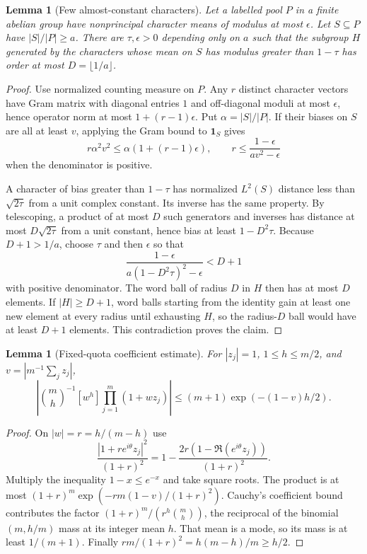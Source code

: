 \documentclass[11pt]{article}
\newtheorem{lemma}[theorem]{Lemma}
\theoremstyle{remark}\newtheorem{remark}[theorem]{Remark}
\newcommand{\abs}[1]{\left|#1\right|}
\newcommand{\one}{\mathbf 1}
\begin{document}
\begin{lemma}[Few almost-constant characters]\label{lem:gram}
Let a labelled pool $P$ in a finite abelian group have nonprincipal character means of modulus at most $\epsilon$. Let $S\subseteq P$ have $|S|/|P|\ge a$. There are $\tau,\epsilon>0$ depending only on $a$ such that the subgroup $H$ generated by the characters whose mean on $S$ has modulus greater than $1-\tau$ has order at most $D=\lfloor1/a\rfloor$.
\end{lemma}
\begin{proof}
Use normalized counting measure on $P$. Any $r$ distinct character vectors have Gram matrix with diagonal entries $1$ and off-diagonal moduli at most $\epsilon$, hence operator norm at most $1+(r-1)\epsilon$. Put $\alpha=|S|/|P|$. If their biases on $S$ are all at least $v$, applying the Gram bound to $\one_S$ gives
\[
 r\alpha^2v^2\le\alpha(1+(r-1)\epsilon),\qquad
 r\le\frac{1-\epsilon}{a v^2-\epsilon}
\]
when the denominator is positive.

A character of bias greater than $1-\tau$ has normalized $L^2(S)$ distance less than $\sqrt{2\tau}$ from a unit complex constant. Its inverse has the same property. By telescoping, a product of at most $D$ such generators and inverses has distance at most $D\sqrt{2\tau}$ from a unit constant, hence bias at least $1-D^2\tau$. Because $D+1>1/a$, choose $\tau$ and then $\epsilon$ so that
\[
 \frac{1-\epsilon}{a(1-D^2\tau)^2-\epsilon}<D+1
\]
with positive denominator. The word ball of radius $D$ in $H$ then has at most $D$ elements. If $|H|\ge D+1$, word balls starting from the identity gain at least one new element at every radius until exhausting $H$, so the radius-$D$ ball would have at least $D+1$ elements. This contradiction proves the claim.
\end{proof}

\begin{lemma}[Fixed-quota coefficient estimate]\label{lem:circle}
For $|z_j|=1$, $1\le h\le m/2$, and $v=|m^{-1}\sum_jz_j|$,
\[
 \abs{\binom mh^{-1}[w^h]\prod_{j=1}^m(1+wz_j)}
 \le(m+1)\exp(-(1-v)h/2).
\]
\end{lemma}
\begin{proof}
On $|w|=r=h/(m-h)$ use
\[
 \frac{|1+re^{i\theta}z_j|^2}{(1+r)^2}
 =1-\frac{2r(1-\Re(e^{i\theta}z_j))}{(1+r)^2}.
\]
Multiply the inequality $1-x\le e^{-x}$ and take square roots. The product is at most
$(1+r)^m\exp(-rm(1-v)/(1+r)^2)$. Cauchy's coefficient bound contributes the factor $(1+r)^m/(r^h\binom mh)$, the reciprocal of the binomial $(m,h/m)$ mass at its integer mean $h$. That mean is a mode, so its mass is at least $1/(m+1)$. Finally $rm/(1+r)^2=h(m-h)/m\ge h/2$.
\end{proof}
\end{document}
